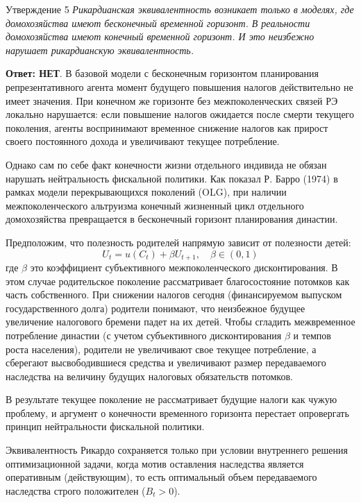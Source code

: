\documentclass[10pt,a4paper]{article}
\newcommand{\qnet}{\textbf{\color{nored}Ответ: НЕТ}}
\newenvironment{answer}[2]{%
  \begin{qbox}{Утверждение #1}
  \textit{#2}\par\smallskip
}{%
  \end{qbox}\vspace{2pt}
}
\begin{document}
\begin{answer}{5}{Рикардианская эквивалентность возникает только в моделях, где домохозяйства имеют бесконечный временной горизонт. В реальности домохозяйства имеют конечный временной горизонт. И это неизбежно нарушает рикардианскую эквивалентность.}
\qnet. В базовой модели с бесконечным горизонтом планирования репрезентативного агента момент будущего повышения налогов действительно не имеет значения. При конечном же горизонте без межпоколенческих связей РЭ локально нарушается: если повышение налогов ожидается после смерти текущего поколения, агенты воспринимают временное снижение налогов как прирост своего постоянного дохода и увеличивают текущее потребление.

Однако сам по себе факт конечности жизни отдельного индивида не обязан нарушать нейтральность фискальной политики. Как показал Р. Барро (1974) в рамках модели перекрывающихся поколений (OLG), при наличии межпоколенческого альтруизма конечный жизненный цикл отдельного домохозяйства превращается в  бесконечный горизонт планирования династии.

Предположим, что полезность родителей напрямую зависит от полезности детей:
\begin{equation}
    U_t = u(C_t) + \beta U_{t+1}, \quad \beta \in (0, 1)
\end{equation}
где $\beta$ это коэффициент субъективного межпоколенческого дисконтирования. В этом случае родительское поколение рассматривает благосостояние потомков как часть собственного. При снижении налогов сегодня (финансируемом выпуском государственного долга) родители понимают, что неизбежное будущее увеличение налогового бремени падет на их детей. Чтобы сгладить межвременное потребление династии (с учетом субъективного дисконтирования $\beta$ и темпов роста населения), родители не увеличивают свое текущее потребление, а сберегают высвободившиеся средства и увеличивают размер передаваемого наследства на величину будущих налоговых обязательств потомков.

В результате текущее поколение не рассматривает будущие налоги как чужую проблему, и аргумент о конечности временного горизонта перестает опровергать принцип нейтральности фискальной политики.

Эквивалентность Рикардо сохраняется только при условии внутреннего решения оптимизационной задачи, когда мотив оставления наследства является оперативным (действующим), то есть оптимальный объем передаваемого наследства строго положителен ($B_t > 0$).


\end{answer}
\end{document}
